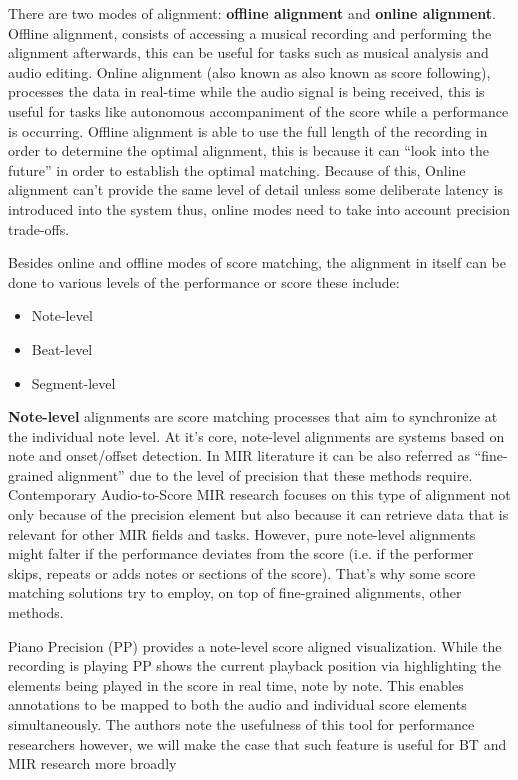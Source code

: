 There are two modes of alignment: \textbf{offline alignment} and \textbf{online alignment}. Offline alignment, consists of accessing a musical recording and performing the alignment afterwards, this can be useful for tasks such as musical analysis and audio editing. Online alignment (also known as also known as score following), processes the data in real-time while the audio signal is being received, this is useful for tasks like autonomous accompaniment of the score while a performance is occurring. Offline alignment is able to use the full length of the recording in order to determine the optimal alignment, this is because it can ``look into the future'' in order to establish the optimal matching. Because of this, Online alignment can't provide the same level of detail unless some deliberate latency is introduced into the system thus, online modes need to take into account precision trade-offs. 

Besides online and offline modes of score matching, the alignment in itself can be done to various levels of the performance or score these include:
\begin{itemize}
    \item Note-level
    \item Beat-level
    \item Segment-level
\end{itemize}
 
\textbf{Note-level} alignments are score matching processes that aim to synchronize at the individual note level. At it's core, note-level alignments are systems based on note and onset/offset detection. In \ac{MIR} literature it can be also referred as ``fine-grained alignment'' due to the level of precision that these methods require. Contemporary Audio-to-Score \ac{MIR} research focuses on this type of alignment not only because of the precision element but also because it can retrieve data that is relevant for other \ac{MIR} fields and tasks. However, pure note-level alignments might falter if the performance deviates from the score (i.e. if the performer skips, repeats or adds notes or sections of the score). That's why some score matching solutions try to employ, on top of fine-grained alignments, other methods.

 Piano Precision (\ac{PP}) provides a note-level score aligned visualization. While the recording is playing \ac{PP} shows the current playback position via highlighting the elements being played in the score in real time, note by note. This enables annotations to be mapped to both the audio and individual score elements simultaneously. The authors note the usefulness of this tool for performance researchers \cite{jiangPIANOPRECISIONADVANCING2025} however, we will make the case that such feature is useful for \ac{BT} and \ac{MIR} research more broadly

